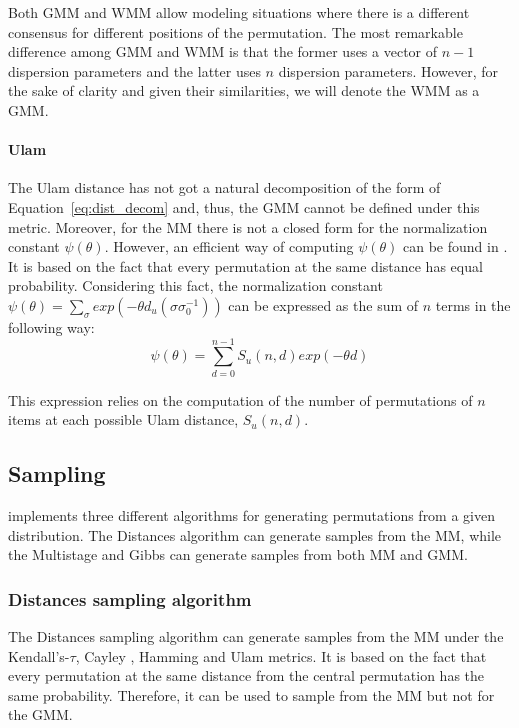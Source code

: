 \documentclass[article,nojss]{jss}
\begin{document}
Both GMM and WMM allow modeling situations where there is a different consensus for different positions of the permutation. The most remarkable difference among GMM and WMM is that the former uses a vector of $n-1$ dispersion parameters and the latter uses $n$ dispersion parameters. However, for the sake of clarity and given their similarities, we will denote the WMM as a GMM.

\paragraph{Ulam}
The Ulam distance has not got a natural decomposition of the form of Equation~\eqref{eq:dist_decom} and, thus, the GMM cannot be defined under this metric. Moreover, for the MM there is not a closed form for the normalization constant $\psi(\theta)$. However, an efficient way of computing $\psi(\theta)$ can be found in \cite{Irurozki2014}. It is based on the fact that every permutation at the same distance has equal probability. Considering this fact, the normalization constant $\psi(\theta)=\sum _{ \sigma}  exp({-\theta d_u(\sigma \sigma_0^{-1})})$ can be expressed as the sum of $n$ terms in the following way:
\begin{equation}
\psi(\theta) = \sum _{d=0}^{n-1} S_u(n,d)  exp(-\theta d)
\end{equation}

This expression relies on the computation of the number of permutations of $n$ items at each possible Ulam distance, $ S_u(n,d)$.


\subsection{Sampling}%
\label{sec:sampling}
 implements three different algorithms for generating permutations from a given distribution. 
The Distances algorithm can generate samples from the MM, while the Multistage and Gibbs can generate samples from both MM and GMM.

\subsubsection{Distances sampling algorithm}%
The Distances sampling algorithm can generate samples from the MM under the Kendall's-$\tau$, Cayley \citep{Irurozki2014b}, Hamming \citep{Irurozki2014a} and Ulam \citep{Irurozki2014} metrics. It is based on the fact that every permutation at the same distance from the central permutation has the same probability. Therefore, it can be used to sample from the MM but not for the GMM. 
\end{document}
